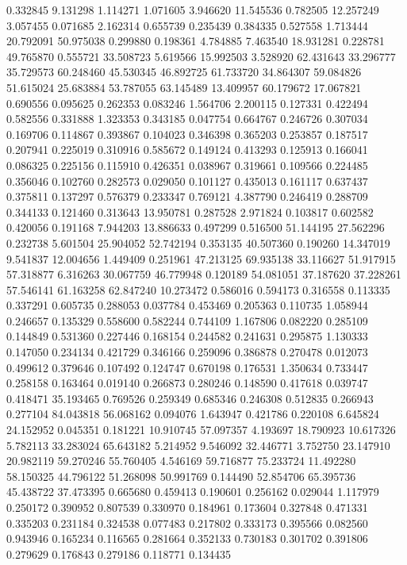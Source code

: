 0.332845
9.131298
1.114271
1.071605
3.946620
11.545536
0.782505
12.257249
3.057455
0.071685
2.162314
0.655739
0.235439
0.384335
0.527558
1.713444
20.792091
50.975038
0.299880
0.198361
4.784885
7.463540
18.931281
0.228781
49.765870
0.555721
33.508723
5.619566
15.992503
3.528920
62.431643
33.296777
35.729573
60.248460
45.530345
46.892725
61.733720
34.864307
59.084826
51.615024
25.683884
53.787055
63.145489
13.409957
60.179672
17.067821
0.690556
0.095625
0.262353
0.083246
1.564706
2.200115
0.127331
0.422494
0.582556
0.331888
1.323353
0.343185
0.047754
0.664767
0.246726
0.307034
0.169706
0.114867
0.393867
0.104023
0.346398
0.365203
0.253857
0.187517
0.207941
0.225019
0.310916
0.585672
0.149124
0.413293
0.125913
0.166041
0.086325
0.225156
0.115910
0.426351
0.038967
0.319661
0.109566
0.224485
0.356046
0.102760
0.282573
0.029050
0.101127
0.435013
0.161117
0.637437
0.375811
0.137297
0.576379
0.233347
0.769121
4.387790
0.246419
0.288709
0.344133
0.121460
0.313643
13.950781
0.287528
2.971824
0.103817
0.602582
0.420056
0.191168
7.944203
13.886633
0.497299
0.516500
51.144195
27.562296
0.232738
5.601504
25.904052
52.742194
0.353135
40.507360
0.190260
14.347019
9.541837
12.004656
1.449409
0.251961
47.213125
69.935138
33.116627
51.917915
57.318877
6.316263
30.067759
46.779948
0.120189
54.081051
37.187620
37.228261
57.546141
61.163258
62.847240
10.273472
0.586016
0.594173
0.316558
0.113335
0.337291
0.605735
0.288053
0.037784
0.453469
0.205363
0.110735
1.058944
0.246657
0.135329
0.558600
0.582244
0.744109
1.167806
0.082220
0.285109
0.144849
0.531360
0.227446
0.168154
0.244582
0.241631
0.295875
1.130333
0.147050
0.234134
0.421729
0.346166
0.259096
0.386878
0.270478
0.012073
0.499612
0.379646
0.107492
0.124747
0.670198
0.176531
1.350634
0.733447
0.258158
0.163464
0.019140
0.266873
0.280246
0.148590
0.417618
0.039747
0.418471
35.193465
0.769526
0.259349
0.685346
0.246308
0.512835
0.266943
0.277104
84.043818
56.068162
0.094076
1.643947
0.421786
0.220108
6.645824
24.152952
0.045351
0.181221
10.910745
57.097357
4.193697
18.790923
10.617326
5.782113
33.283024
65.643182
5.214952
9.546092
32.446771
3.752750
23.147910
20.982119
59.270246
55.760405
4.546169
59.716877
75.233724
11.492280
58.150325
44.796122
51.268098
50.991769
0.144490
52.854706
65.395736
45.438722
37.473395
0.665680
0.459413
0.190601
0.256162
0.029044
1.117979
0.250172
0.390952
0.807539
0.330970
0.184961
0.173604
0.327848
0.471331
0.335203
0.231184
0.324538
0.077483
0.217802
0.333173
0.395566
0.082560
0.943946
0.165234
0.116565
0.281664
0.352133
0.730183
0.301702
0.391806
0.279629
0.176843
0.279186
0.118771
0.134435
